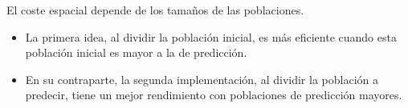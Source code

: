 		\begin{flushleft}
			El coste espacial depende de los tamaños de las poblaciones.		
		\end{flushleft}
		
		\begin{itemize}
			\item La primera idea, al dividir la población inicial, es más eficiente cuando esta población inicial es mayor a la de predicción. 
			\item En su contraparte, la segunda implementación, al dividir la población a predecir, tiene un mejor rendimiento con poblaciones de predicción mayores.
		\end{itemize}
		
		\begin{figure}[!h]
			\centering
			

\end{figure}
